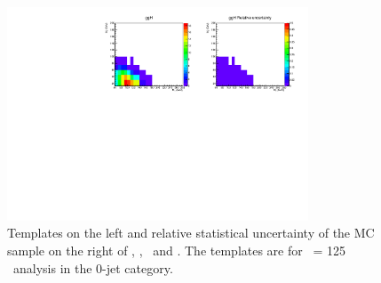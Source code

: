 \begin{figure}[htp]
\includegraphics[width=0.8\textwidth]{figures/2dtemplate_ggH_mH125_0j.pdf}
\caption{Templates on the left and relative statistical uncertainty of the MC sample 
on the right of \qqWH, \qqZH, \qqH\ and \ggH. 
The templates are for \mHi\ = 125 \GeV\ analysis in the 0-jet category.
}
\label{fig:2dtemplate_125_0j_1}
\end{figure}

